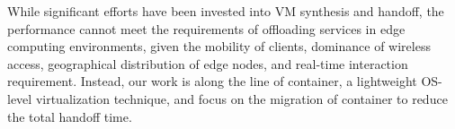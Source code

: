 While significant efforts have been invested into VM synthesis and handoff, the performance cannot meet the requirements of offloading services in edge computing environments, given the mobility of clients, dominance of wireless access, geographical distribution of edge nodes, and real-time interaction requirement. Instead,  our work is along the line of container, a lightweight OS-level virtualization technique, and focus on the migration of container to reduce the total handoff time. 





